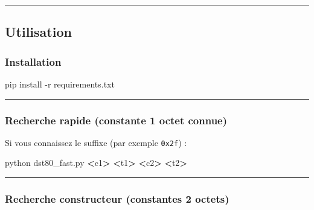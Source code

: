 \documentclass[
  french,
]{article}
\newenvironment{Shaded}{\begin{snugshade}}{\end{snugshade}}
\newcommand{\AttributeTok}[1]{\textcolor[rgb]{0.13,0.29,0.53}{#1}}
\newcommand{\ExtensionTok}[1]{#1}
\newcommand{\NormalTok}[1]{#1}
\newcommand{\OperatorTok}[1]{\textcolor[rgb]{0.81,0.36,0.00}{\textbf{#1}}}
\begin{document}
\begin{center}\rule{0.5\linewidth}{0.5pt}\end{center}

\subsection{Utilisation}\label{utilisation}

\subsubsection{Installation}\label{installation}

\begin{Shaded}
\begin{Highlighting}[]
\ExtensionTok{pip}\NormalTok{ install }\AttributeTok{{-}r}\NormalTok{ requirements.txt}
\end{Highlighting}
\end{Shaded}

\begin{center}\rule{0.5\linewidth}{0.5pt}\end{center}

\subsubsection{Recherche rapide (constante 1 octet
connue)}\label{recherche-rapide-constante-1-octet-connue}

Si vous connaissez le suffixe (par exemple \texttt{0x2f}) :

\begin{Shaded}
\begin{Highlighting}[]
\ExtensionTok{python}\NormalTok{ dst80\_fast.py }\OperatorTok{\textless{}}\NormalTok{c1}\OperatorTok{\textgreater{}} \OperatorTok{\textless{}}\NormalTok{t1}\OperatorTok{\textgreater{}} \OperatorTok{\textless{}}\NormalTok{c2}\OperatorTok{\textgreater{}} \OperatorTok{\textless{}}\NormalTok{t2}\OperatorTok{\textgreater{}}
\end{Highlighting}
\end{Shaded}

\begin{center}\rule{0.5\linewidth}{0.5pt}\end{center}

\subsubsection{Recherche constructeur (constantes 2
octets)}\label{recherche-constructeur-constantes-2-octets}
\end{document}
